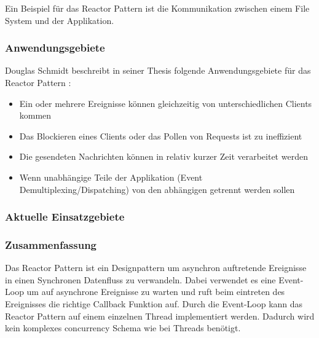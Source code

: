 Ein Beispiel für das Reactor Pattern ist die Kommunikation zwischen einem File System und der Applikation.




\subsubsection{Anwendungsgebiete}

Douglas Schmidt beschreibt in seiner Thesis folgende Anwendungsgebiete für das Reactor Pattern \cite[p. 4]{Sch95}:

\begin{itemize}
  \item Ein oder mehrere Ereignisse können gleichzeitig von unterschiedlichen Clients kommen
  \item Das Blockieren eines Clients oder das Pollen von Requests ist zu ineffizient
  \item Die gesendeten Nachrichten können in relativ kurzer Zeit verarbeitet werden
  \item Wenn unabhängige Teile der Applikation (Event Demultiplexing/Dispatching) von den abhängigen getrennt werden sollen
\end{itemize}


\subsubsection{Aktuelle Einsatzgebiete}


\subsubsection{Zusammenfassung}

Das Reactor Pattern ist ein Designpattern um asynchron auftretende Ereignisse in einen Synchronen Datenfluss zu verwandeln. Dabei verwendet es eine Event-Loop um auf asynchrone Ereignisse zu warten und ruft beim eintreten des Ereignisses die richtige Callback Funktion auf. Durch die Event-Loop kann das Reactor Pattern auf einem einzelnen Thread implementiert werden. Dadurch wird kein komplexes concurrency Schema wie bei Threads benötigt.